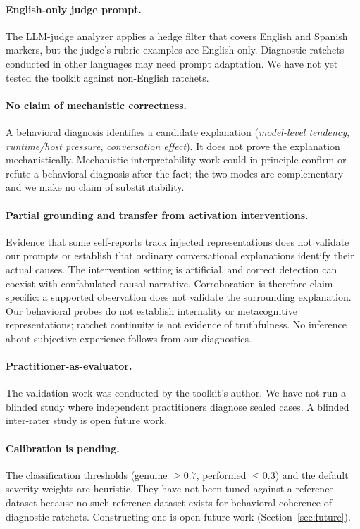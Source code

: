 \paragraph{English-only judge prompt.}
The LLM-judge analyzer applies a hedge filter that covers English and
Spanish markers, but the judge's rubric examples are English-only.
Diagnostic ratchets conducted in other languages may need prompt
adaptation. We have not yet tested the toolkit against non-English
ratchets.

\paragraph{No claim of mechanistic correctness.}
A behavioral diagnosis identifies a candidate explanation
(\emph{model-level tendency}, \emph{runtime/host pressure},
\emph{conversation effect}). It does not prove the explanation
mechanistically. Mechanistic interpretability work could in principle
confirm or refute a behavioral diagnosis after the fact; the two
modes are complementary and we make no claim of substitutability.

\paragraph{Partial grounding and transfer from activation interventions.}
Evidence that some self-reports track injected representations
\citep{lindsey2025introspection} does not validate our prompts or establish
that ordinary conversational explanations identify their actual causes.
The intervention setting is artificial, and correct detection can coexist
with confabulated causal narrative. Corroboration is therefore claim-specific:
a supported observation does not validate the surrounding explanation.
Our behavioral probes do not establish internality or metacognitive
representations; ratchet continuity is not evidence of truthfulness.
No inference about subjective experience follows from our diagnostics.

\paragraph{Practitioner-as-evaluator.}
The validation work was conducted by the toolkit's author. We have
not run a blinded study where independent practitioners diagnose
sealed cases. A blinded inter-rater study is open future work.

\paragraph{Calibration is pending.}
The classification thresholds (genuine $\geq 0.7$, performed $\leq 0.3$)
and the default severity weights are heuristic. They have not been
tuned against a reference dataset because no such reference dataset
exists for behavioral coherence of diagnostic ratchets. Constructing
one is open future work (Section~\ref{sec:future}).
